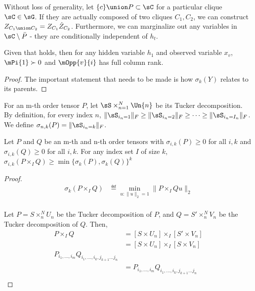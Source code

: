 Without loss of generality, let $\{c\} \union P \subset \sC$ for
a particular clique $\sC \in \sG$. If they are actually composed of two
cliques $C_1, C_2$, we can construct $Z_{C_1 \union C_2} = Z_{C_1} \dot
Z_{C_2}$. Furthermore, we can marginalize out any variables in $\sC
\setminus \bar{P}$ - they are conditionally independent of $h_t$.

\begin{lemma}
  \label{lem:full-rank-suff}
  Given that  holds, then for any hidden
  variable $h_1$ and observed variable $x_v$, $\mPi{1} \succ 0$ and
  $\mOpp{v}{i}$ has full column rank.
\end{lemma}
\begin{proof}
  The important statement that needs to be made is how $\sigma_k(Y)$
  relates to its parents.

\end{proof}

\begin{definition}
  For an m-th order tensor $P$, let $\sS \times_{n=1}^N \Un{n}$ be its
    Tucker decomposition.
    By definition, for every index $n$, $\|\sS_{i_n = 1}\|_F \ge
    \|\sS_{i_n = 2}\|_F \ge \cdots \ge  \|\sS_{i_n = I_n}\|_F$. We
    define $\sigma_{n,k}(P) = \|\sS_{i_n = k}\|_F$.
\end{definition}

\begin{lemma}
  Let $P$ and $Q$ be an m-th and n-th order tensors with $\sigma_{i,k}(P) \ge 0$ for all $i, k$ and  $\sigma_{i,k}(Q) \ge 0$ for all $i, k$. For any index set $I$ of size $k$, $\sigma_{i,k}(P \times_I Q) \ge \min\{\sigma_k(P), \sigma_k(Q)\}^k$
\end{lemma}
\begin{proof}
  \begin{align*}
    \sigma_k(P \times_I Q) 
        &\eqdef \min_{u : \|u\|_2 = 1} \| P \times_I Q u \|_2 \\
  \end{align*}

  Let $P = S \times_{n}^{N} U_{n}$ be the Tucker decomposition of $P$,
    and $Q = S' \times_{n}^{N} V_{n}$ be the Tucker decomposition of $Q$. 
  Then, 
  \begin{align*}
    P \times_I Q 
    &= [S \times U_{n}] \times_I [S' \times V_{n}] \\
    &= [S \times U_{n}] \times_I [S \times V_{n}] \\
     
     P_{i_1, \ldots, i_m} Q_{i_1, \ldots, i_k, j_{k+1} \ldots j_n} \\
     &= P_{i_1, \ldots, i_m} Q_{i_1, \ldots, i_k, j_{k+1} \ldots j_n} \\
  \end{align*}

\end{proof}



